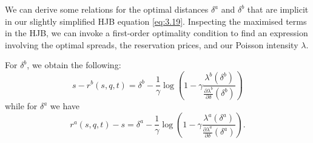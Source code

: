 We can derive some relations for the optimal distances $\delta^a$ and $\delta^b$
that are implicit in our slightly simplified HJB equation \eqref{eq:3.19}. Inspecting
the maximised terms in the HJB, we can invoke a first-order optimality condition to
find an expression involving the optimal spreads, the reservation prices, and our 
Poisson intensity $\lambda$. 
\begin{theorem}
    For $\delta^b$, we obtain the following:
    \begin{equation}\label{eq:3.22}
        s-r^b(s,q,t)=\delta^b-\frac{1}{\gamma}\log\left(1-\gamma\frac{\lambda^b(\delta^b)}{\frac{\partial\lambda^b}{\partial\delta}(\delta^b)}\right)
    \end{equation}
    while for $\delta^a$ we have
    \begin{equation}\label{eq:3.23}
        r^a(s,q,t)-s=\delta^a-\frac{1}{\gamma}\log\left(1-\gamma\frac{\lambda^a(\delta^a)}{\frac{\partial\lambda^a}{\partial\delta}(\delta^a)}\right).
    \end{equation}
\end{theorem}
